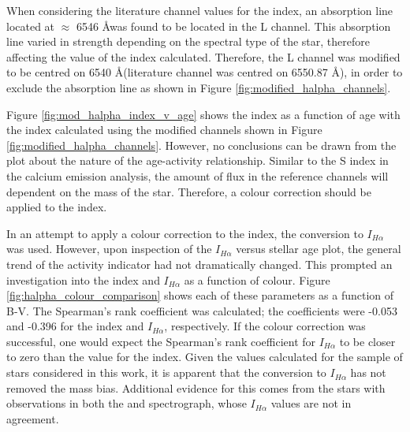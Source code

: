 When considering the literature channel values for the \Halpha index, an absorption line located at $\approx$ 6546 \AA \space was found to be located in the L channel. This absorption line varied in strength depending on the spectral type of the star, therefore affecting the value of the \Halpha index calculated. Therefore, the L channel was modified to be centred on 6540 \AA \space (literature channel was centred on 6550.87 \AA), in order to exclude the absorption line as shown in Figure \ref{fig:modified_halpha_channels}. 

Figure \ref{fig:mod_halpha_index_v_age} shows the \Halpha index as a function of age with the \Halpha index calculated using the modified channels shown in Figure \ref{fig:modified_halpha_channels}. However, no conclusions can be drawn from the plot about the nature of the age-activity relationship. Similar to the S index in the calcium emission analysis, the amount of flux in the reference channels will dependent on the mass of the star. Therefore, a colour correction should be applied to the \Halpha index.

In an attempt to apply a colour correction to the \Halpha index, the conversion to $I_{H\alpha}$ \citep{Gomes_da_Silva_etal_2014} was used. However, upon inspection of the $I_{H\alpha}$ versus stellar age plot, the general trend of the activity indicator had not dramatically changed. This prompted an investigation into the \Halpha index and $I_{H\alpha}$ as a function of colour. Figure \ref{fig:halpha_colour_comparison} shows each of these parameters as a function of B-V. The Spearman's rank coefficient was calculated; the coefficients were -0.053 and -0.396 for the \Halpha index and $I_{H\alpha}$, respectively. If the colour correction was successful, one would expect the Spearman's rank coefficient for $I_{H\alpha}$ to be closer to zero than the value for the \Halpha index. Given the values calculated for the sample of stars considered in this work, it is apparent that the conversion to $I_{H\alpha}$ has not removed the mass bias. Additional evidence for this comes from the stars with observations in both the \esp and \narval spectrograph, whose $I_{H\alpha}$ values are not in agreement.

